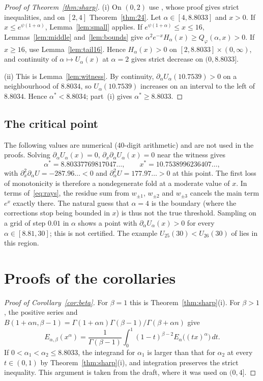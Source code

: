 \documentclass[11pt,a4paper]{article}
\theoremstyle{plain}
\theoremstyle{remark}
\begin{document}
\begin{proof}[Proof of Theorem~\ref{thm:sharp}]
(i) On $(0,2)$ use \cite[Theorem~A]{FS}, whose proof gives strict inequalities, and on $[2,4]$
Theorem~\ref{thm:24}. Let
$\alpha\in[4,8.8033]$ and $x>0$. If $x\le e^{\psi(1+\alpha)}$, Lemma~\ref{lem:small} applies. If
$e^{\psi(1+\alpha)}\le x\le16$, Lemmas~\ref{lem:middle} and~\ref{lem:bounds} give
$\alpha^2e^{-x}H_\alpha(x)\ge Q_\varphi(\alpha,x)>0$. If $x\ge16$, use Lemma~\ref{lem:tail16}.
Hence $H_\alpha(x)>0$ on $[2,8.8033]\times(0,\infty)$, and continuity of $\alpha\mapsto U_\alpha(x)$
at $\alpha=2$ gives strict decrease on $(0,8.8033]$.

(ii) This is Lemma~\ref{lem:witness}. By continuity, $\partial_\alpha U_\alpha(10.7539)>0$ on a
neighbourhood of $8.8034$, so $U_\alpha(10.7539)$ increases on an interval to the left of
$8.8034$. Hence $\alpha^*<8.8034$; part~(i) gives $\alpha^*\ge8.8033$.
\end{proof}

\subsection{The critical point}\label{subsec:critical}
The following values are numerical (40-digit arithmetic) and are not used in the proofs. Solving
$\partial_\alpha U_\alpha(x)=0$, $\partial_x\partial_\alpha U_\alpha(x)=0$ near the witness gives
\[
 \alpha^*=8.80337769817047\ldots,\qquad x^*=10.7538996236407\ldots,
\]
with $\partial_x^2\partial_\alpha U=-287.96\ldots<0$ and $\partial_\alpha^2U=177.97\ldots>0$ at this
point. The first loss of monotonicity is therefore a nondegenerate fold at a moderate value of $x$.
In terms of~\eqref{eq:rays}, the residue sum from $w_{\pm1}$, $w_{\pm2}$ and $w_{\pm3}$ cancels the
main term $e^x$ exactly there. The natural guess that $\alpha=4$ is the boundary (where the
corrections stop being bounded in $x$) is thus not the true threshold. Sampling on a grid of step
$0.01$ in $\alpha$ shows a point with $\partial_\alpha U_\alpha(x)>0$ for every $\alpha\in[8.81,30]$;
this is not certified. The example $U_{25}(30)<U_{26}(30)$ of \cite{FS} lies in this region.

\section{Proofs of the corollaries}\label{sec:cor}
\begin{proof}[Proof of Corollary~\ref{cor:beta}]
For $\beta=1$ this is Theorem~\ref{thm:sharp}(i). For $\beta>1$, the positive series and
$B(1+\alpha n,\beta-1)=\Gamma(1+\alpha n)\Gamma(\beta-1)/\Gamma(\beta+\alpha n)$ give
\[
 E_{\alpha,\beta}(x^\alpha)=\frac{1}{\Gamma(\beta-1)}\int_0^1(1-t)^{\beta-2}E_\alpha\bigl((tx)^\alpha\bigr)\,dt .
\]
If $0<\alpha_1<\alpha_2\le8.8033$, the integrand for $\alpha_1$ is larger than that for $\alpha_2$
at every $t\in(0,1)$ by Theorem~\ref{thm:sharp}(i), and integration preserves the strict
inequality. This argument is taken from the draft, where it was used on $(0,4]$.
\end{proof}
\end{document}
